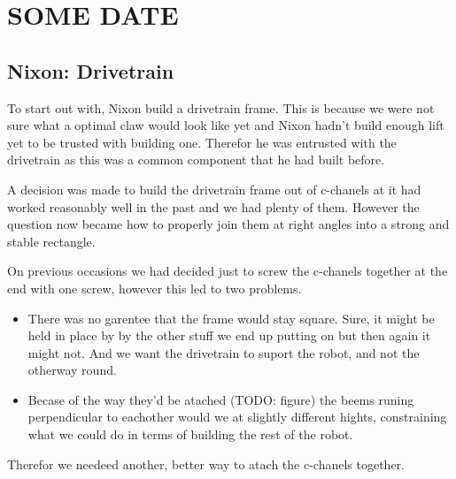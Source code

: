 \documentclass[../../../main.tex]{subfiles}
\begin{document}
\section{SOME DATE}

\subsection{Nixon: Drivetrain}

To start out with, Nixon build a drivetrain frame. This is because we were not sure what a optimal claw would look like yet and Nixon hadn't build enough lift yet to be trusted with building one. Therefor he was entrusted with the drivetrain as this was a common component that he had built before. \par

A decision was made to build the drivetrain frame out of c-chanels at it had worked reasonably well in the past and we had plenty of them. However the question now became how to properly join them at right angles into a strong and stable rectangle. \par

On previous occasions we had decided just to screw the c-chanels together at the end with one screw, however this led to two problems. \par

\begin{itemize}
	\item There was no garentee that the frame would stay square. Sure, it might be held in place by by the other stuff we end up putting on but then again it might not. And we want the drivetrain to suport the robot, and not the otherway round.
	\item Becase of the way they'd be atached (TODO: figure) the beems runing perpendicular to eachother would we at slightly different hights, constraining what we could do in terms of building the rest of the robot.
\end{itemize}

Therefor we needeed another, better way to atach the c-chanels together.
\end{document}
